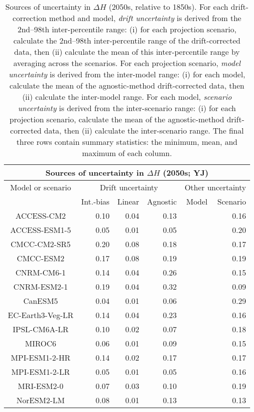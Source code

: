 \begin{table*}[t]
\centering
\caption{Sources of uncertainty in $\Delta H$ (2050s, relative to 1850s). For each drift-correction method and model, \emph{drift uncertainty} is derived from the 2nd--98th inter-percentile range: (i) for each projection scenario, calculate the 2nd--98th inter-percentile range of the drift-corrected data, then (ii) calculate the mean of this inter-percentile range by averaging across the scenarios. For each projection scenario, \emph{model uncertainty} is derived from the inter-model range: (i) for each model, calculate the mean of the agnostic-method drift-corrected data, then (ii) calculate the inter-model range. For each model, \emph{scenario uncertainty} is derived from the inter-scenario range: (i) for each projection scenario, calculate the mean of the agnostic-method drift-corrected data, then (ii) calculate the inter-scenario range. The final three rows contain summary statistics: the minimum, mean, and maximum of each column.}
\begin{tabular}{c|rrr|rr}
\toprule
\multicolumn{6}{c}{Sources of uncertainty in $\Delta H$ (2050s; YJ)} \\ 
\midrule
Model or scenario & \multicolumn{3}{c|}{Drift uncertainty} & \multicolumn{2}{c}{Other uncertainty} \\
 & Int.-bias & Linear & Agnostic & Model & Scenario \\
\midrule
ACCESS-CM2 & 0.10 & 0.04 & 0.13 &  & 0.16 \\
ACCESS-ESM1-5 & 0.05 & 0.01 & 0.05 &  & 0.20 \\
CMCC-CM2-SR5 & 0.20 & 0.08 & 0.18 &  & 0.17 \\
CMCC-ESM2 & 0.17 & 0.08 & 0.19 &  & 0.19 \\
CNRM-CM6-1 & 0.14 & 0.04 & 0.26 &  & 0.15 \\
CNRM-ESM2-1 & 0.19 & 0.04 & 0.32 &  & 0.09 \\
CanESM5 & 0.04 & 0.01 & 0.06 &  & 0.29 \\
EC-Earth3-Veg-LR & 0.14 & 0.04 & 0.23 &  & 0.16 \\
IPSL-CM6A-LR & 0.10 & 0.02 & 0.07 &  & 0.18 \\
MIROC6 & 0.06 & 0.01 & 0.09 &  & 0.15 \\
MPI-ESM1-2-HR & 0.14 & 0.02 & 0.17 &  & 0.17 \\
MPI-ESM1-2-LR & 0.05 & 0.01 & 0.05 &  & 0.16 \\
MRI-ESM2-0 & 0.07 & 0.03 & 0.10 &  & 0.19 \\
NorESM2-LM & 0.08 & 0.01 & 0.13 &  & 0.13 \\

\end{tabular}
\end{table*}
